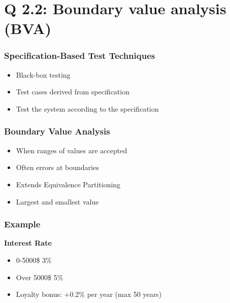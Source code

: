 
\section{Q 2.2: Boundary value analysis (BVA)}

\begin{frame}
    \frametitle{Specification-Based Test Techniques}
    \begin{itemize}
        \item Black-box testing
        \item Test cases derived from specification
        \item Test the system according to the specification
    \end{itemize}
\end{frame}

\begin{frame}
    \frametitle{Boundary Value Analysis}
    \begin{itemize}
        \item When ranges of values are accepted
        \item Often errors at boundaries
        \item Extends Equivalence Partitioning
        \item Largest and smallest value
    \end{itemize}
\end{frame}

\begin{frame}
    \frametitle{Example}
    \textbf{Interest Rate}\\
    \begin{itemize}
        \item 0-5000\$ 3\%
        \item Over 5000\$ 5\%
        \item Loyalty bonus: +0.2\% per year (max 50 years)
    \end{itemize}
\end{frame}


